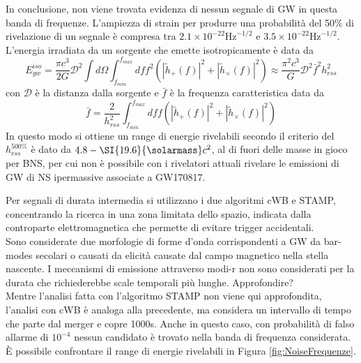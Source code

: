 In conclusione, non viene trovata evidenza di nessun segnale di GW in questa banda di frequenze.
L'ampiezza di strain per produrre una probabilità del 50\% di rivelazione di un segnale è compresa tra $2.1 \times 10^{-22} \text{Hz}^{-1/2}$ e $3.5 \times 10^{-22} \text{Hz}^{-1/2}$. L'energia irradiata da un sorgente che emette isotropicamente è data da 
\begin{equation}
	E_{gw}^{iso} = \frac{\pi c^3}{2G}\mathcal{D}^2\int d\Omega \int_{f_{min}}^{f_{max}}dff^2(|\tilde{h}_+(f)|^2 + |\tilde{h}_\times(f)|^2 ) \approx \frac{\pi^2 c^3}{G}\mathcal{D}^2\bar{f}^2h_{rss}^2
\end{equation}
con $\mathcal{D}$ è la distanza dalla sorgente e $\bar{f}$ è la frequenza caratteristica data da 
\begin{equation}
	\bar{f} = \frac{2}{h_{rss}^2}\int_{f_{min}}^{f_{max}}dff(|\tilde{h}_+(f)|^2 + |\tilde{h}_\times(f)|^2 )
\end{equation}
In questo modo si ottiene un range di energie rivelabili secondo il criterio del $h_{rss}^{500\%}$ è dato da $4.8-\SI{19.6}{\solarmass}c^2$, al di fuori delle masse in gioco per BNS, per cui non è possibile con i rivelatori attuali rivelare le emissioni di GW di NS ipermassive associate a GW170817.

Per segnali di durata intermedia si utilizzano i due algoritmi cWB e STAMP, concentrando la ricerca in una zona limitata dello spazio, indicata dalla controparte elettromagnetica che permette di evitare trigger accidentali.\\
Sono considerate due morfologie di forme d'onda corrispondenti a GW da bar-modes secolari o causati da elicità causate dal campo magnetico nella stella nascente. I meccanismi di emissione attraverso modi-r non sono considerati per la durata che richiederebbe scale temporali più lunghe.
Approfondire?\\
Mentre l'analisi fatta con l'algoritmo STAMP non viene qui approfondita, l'analisi con cWB è analoga alla precedente, ma considera un intervallo di tempo che parte dal merger e copre 1000s. Anche in questo caso, con probabilità di falso allarme di $10^{-4}$ nessun candidato è trovato nella banda di frequenza considerata. È possibile confrontare il range di energie rivelabili in Figura \ref{fig:NoiseFrequenze}.

